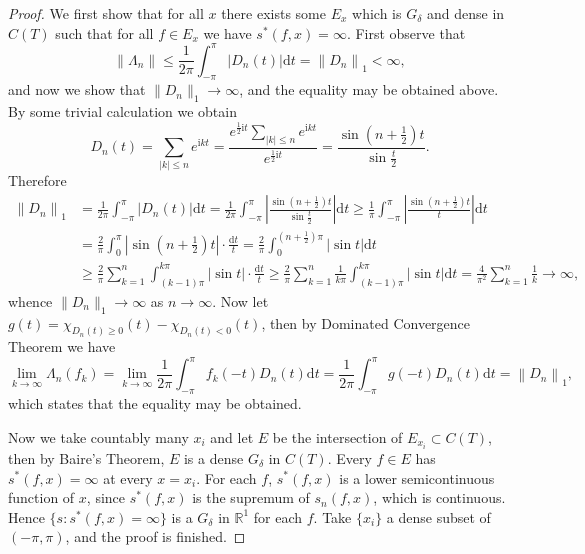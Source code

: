 \begin{proof}
We first show that for all $x$ there exists some $E_x$ which is $G_\delta$ and dense in $C(T)$ such that for all $f\in E_x$ we have $s^*(f,x)=\infty$. First observe that 
$$
\left\| \Lambda _n \right\| \le \frac{1}{2\pi}\int_{-\pi}^{\pi}{\left| D_n\left( t \right) \right|\mathrm{d}t}=\left\| D_n \right\| _1<\infty ,
$$
and now we show that $\|D_n\|_1\to\infty$, and the equality may be obtained above. By some trivial calculation we obtain 
$$
D_n\left( t \right) =\sum_{\left| k \right|\le n}{e^{\mathrm{i}kt}}=\frac{e^{\frac{1}{2}\mathrm{i}t}\sum_{\left| k \right|\le n}{e^{\mathrm{i}kt}}}{e^{\frac{1}{2}\mathrm{i}t}}=\frac{\sin \left( n+\frac{1}{2} \right) t}{\sin \frac{t}{2}}.
$$
Therefore 
$$
\begin{aligned}
\left\| D_n \right\| _1&=\frac{1}{2\pi}\int_{-\pi}^{\pi}{\left| D_n\left( t \right) \right|\mathrm{d}t}=\frac{1}{2\pi}\int_{-\pi}^{\pi}{\left| \frac{\sin \left( n+\frac{1}{2} \right) t}{\sin \frac{t}{2}} \right|\mathrm{d}t}\ge \frac{1}{\pi}\int_{-\pi}^{\pi}{\left| \frac{\sin \left( n+\frac{1}{2} \right) t}{t} \right|\mathrm{d}t}
\\
&=\frac{2}{\pi}\int_0^{\pi}{\left| \sin \left( n+\frac{1}{2} \right) t \right|\cdot \frac{\mathrm{d}t}{t}}=\frac{2}{\pi}\int_0^{\left( n+\frac{1}{2} \right) \pi}{\left| \sin t \right|\mathrm{d}t}
\\
&\ge \frac{2}{\pi}\sum_{k=1}^n{\int_{\left( k-1 \right) \pi}^{k\pi}{\left| \sin t \right|\cdot \frac{\mathrm{d}t}{t}}}\ge \frac{2}{\pi}\sum_{k=1}^n{\frac{1}{k\pi}\int_{\left( k-1 \right) \pi}^{k\pi}{\left| \sin t \right|\mathrm{d}t}}=\frac{4}{\pi ^2}\sum_{k=1}^n{\frac{1}{k}}\rightarrow \infty ,
\end{aligned}
$$
whence $\|D_n\|_1\to\infty$ as $n\to\infty$. Now let $g\left( t \right) =\chi _{D_n\left( t \right) \ge 0}\left( t \right) -\chi _{D_n\left( t \right) <0}\left( t \right) $, then by Dominated Convergence Theorem we have 
$$
\lim_{k\rightarrow \infty} \Lambda _n\left( f_k \right) =\lim_{k\rightarrow \infty} \frac{1}{2\pi}\int_{-\pi}^{\pi}{f_k\left( -t \right) D_n\left( t \right) \mathrm{d}t}=\frac{1}{2\pi}\int_{-\pi}^{\pi}{g\left( -t \right) D_n\left( t \right) \mathrm{d}t}=\left\| D_n \right\| _1,
$$
which states that the equality may be obtained.\par
Now we take countably many $x_i$ and let $E$ be the intersection of $E_{x_i}\subset C(T)$, then by Baire's Theorem, $E$ is a dense $G_\delta$ in $C(T)$. Every $f\in E$ has $s^*(f,x)=\infty$ at every $x=x_i$. For each $f$, $s^*(f,x)$ is a lower semicontinuous function of $x$, since $s^*(f,x)$ is the supremum of $s_n(f,x)$, which is continuous. Hence $\{s:s^*(f,x)=\infty\}$ is a $G_\delta$ in $\mathbb{R}^1$ for each $f$. Take $\{x_i\}$ a dense subset of $(-\pi,\pi)$, and the proof is finished.
\end{proof}
